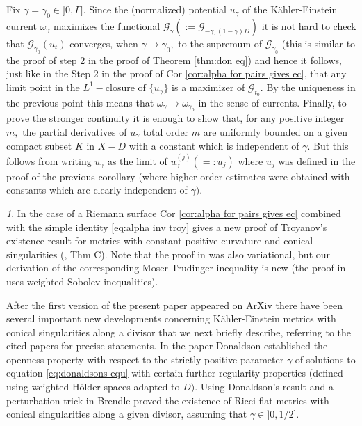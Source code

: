 \documentclass[11pt,oneside,english]{amsart}
\numberwithin{equation}{section}
\numberwithin{figure}{section}
\theoremstyle{plain}
\theoremstyle{plain}
\theoremstyle{plain}
\theoremstyle{plain}
\theoremstyle{remark}
\newtheorem{rem}[thm]{\protect\remarkname}
\theoremstyle{definition}
\providecommand{\remarkname}{Remark}
\begin{document}
Fix $\gamma=\gamma_{0}\in]0,\Gamma].$ Since the (normalized) potential
$u_{\gamma}$ of the Kähler-Einstein current $\omega_{\gamma}$ maximizes
the functional $\mathcal{G}_{\gamma}(:=\mathcal{G}_{-\gamma,(1-\gamma)D})$
it is not hard to check that $\mathcal{G}_{\gamma_{0}}(u_{t})$ converges,
when $\gamma\rightarrow\gamma_{0},$ to the supremum of $\mathcal{G}_{\gamma_{0}}$
(this is similar to the proof of step 2 in the proof of Theorem \ref{thm:don eq})
and hence it follows, just like in the Step 2 in the proof of Cor
\ref{cor:alpha for pairs gives ec}, that any limit point in the $L^{1}-$closure
of $\{u_{\gamma}\}$ is a maximizer of $\mathcal{G}_{t_{0}}.$ By
the uniqueness in the previous point this means that $\omega_{\gamma}\rightarrow\omega_{\gamma_{0}}$
in the sense of currents. Finally, to prove the stronger continuity
it is enough to show that, for any positive integer $m,$ the partial
derivatives of $u_{\gamma}$ total order $m$ are uniformly bounded
on a given compact subset $K$ in $X-D$ with a constant which is
independent of $\gamma.$ But this follows from writing $u_{\gamma}$
as the limit of $u_{\gamma}^{(j)}(=:u_{j})$ where $u_{j}$ was defined
in the proof of the previous corollary (where higher order estimates
were obtained with constants which are clearly independent of $\gamma).$ 
\begin{rem}
In the case of a Riemann surface Cor \ref{cor:alpha for pairs gives ec}
combined with the simple identity \ref{eq:alpha inv troy} gives a
new proof of Troyanov's existence result for metrics with constant
positive curvature and conical singularities (\cite{tr}, Thm C).
Note that the proof in \cite{tr} was also variational, but our derivation
of the corresponding Moser-Trudinger inequality is new (the proof
in \cite{tr} uses weighted Sobolev inequalities).
\end{rem}
After the first version of the present paper appeared on ArXiv there
have been several important new developments concerning Kähler-Einstein
metrics with conical singularities along a divisor that we next briefly
describe, referring to the cited papers for precise statements. In
the paper \cite{do-3} Donaldson established the openness property
with respect to the strictly positive parameter $\gamma$ of solutions
to equation \ref{eq:donaldsons equ} with certain further regularity
properties (defined using weighted Hölder spaces adapted to $D)$.
Using Donaldson's result and a perturbation trick in \cite{j,ma}
Brendle \cite{br} proved the existence of Ricci flat metrics with
conical singularities along a given divisor, assuming that $\gamma\in]0,1/2].$
\end{document}
